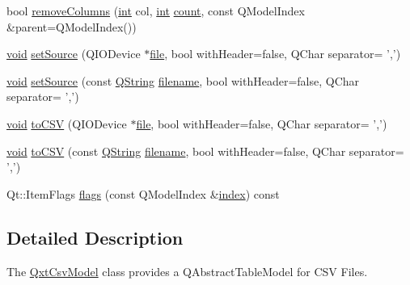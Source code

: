 \begin{DoxyCompactItemize}
\item 
bool \hyperlink{class_qxt_csv_model_ae53f7a456c8e01b4e622585b1a02d402}{remove\-Columns} (\hyperlink{ioapi_8h_a787fa3cf048117ba7123753c1e74fcd6}{int} col, \hyperlink{ioapi_8h_a787fa3cf048117ba7123753c1e74fcd6}{int} \hyperlink{glext_8h_a5b40aca7a9682963dd00a8f5aef0a901}{count}, const Q\-Model\-Index \&parent=Q\-Model\-Index())
\item 
\hyperlink{group___u_a_v_objects_plugin_ga444cf2ff3f0ecbe028adce838d373f5c}{void} \hyperlink{class_qxt_csv_model_a161072a199ca5e6388500de99d73c3e8}{set\-Source} (Q\-I\-O\-Device $\ast$\hyperlink{uavobjecttemplate_8m_a97c04efa65bcf0928abf9260bc5cbf46}{file}, bool with\-Header=false, Q\-Char separator= ',')
\item 
\hyperlink{group___u_a_v_objects_plugin_ga444cf2ff3f0ecbe028adce838d373f5c}{void} \hyperlink{class_qxt_csv_model_afaf5e74bda9f44a90df9d95e367aac27}{set\-Source} (const \hyperlink{group___u_a_v_objects_plugin_gab9d252f49c333c94a72f97ce3105a32d}{Q\-String} \hyperlink{ioapi_8h_a7a03a664b090ce5c848ecb31cb4a2fa8}{filename}, bool with\-Header=false, Q\-Char separator= ',')
\item 
\hyperlink{group___u_a_v_objects_plugin_ga444cf2ff3f0ecbe028adce838d373f5c}{void} \hyperlink{class_qxt_csv_model_aca35cec85bc21181d89004990930948e}{to\-C\-S\-V} (Q\-I\-O\-Device $\ast$\hyperlink{uavobjecttemplate_8m_a97c04efa65bcf0928abf9260bc5cbf46}{file}, bool with\-Header=false, Q\-Char separator= ',')
\item 
\hyperlink{group___u_a_v_objects_plugin_ga444cf2ff3f0ecbe028adce838d373f5c}{void} \hyperlink{class_qxt_csv_model_ae9563638e903e3644b0245ddb5b56fc5}{to\-C\-S\-V} (const \hyperlink{group___u_a_v_objects_plugin_gab9d252f49c333c94a72f97ce3105a32d}{Q\-String} \hyperlink{ioapi_8h_a7a03a664b090ce5c848ecb31cb4a2fa8}{filename}, bool with\-Header=false, Q\-Char separator= ',')
\item 
Qt\-::\-Item\-Flags \hyperlink{class_qxt_csv_model_acfe9b5cc0f1caefb4bb39cb45e6a3e4c}{flags} (const Q\-Model\-Index \&\hyperlink{glext_8h_ab47dd9958bcadea08866b42bf358e95e}{index}) const 
\end{DoxyCompactItemize}


\subsection{Detailed Description}
The \hyperlink{class_qxt_csv_model}{Qxt\-Csv\-Model} class provides a Q\-Abstract\-Table\-Model for C\-S\-V Files. 

